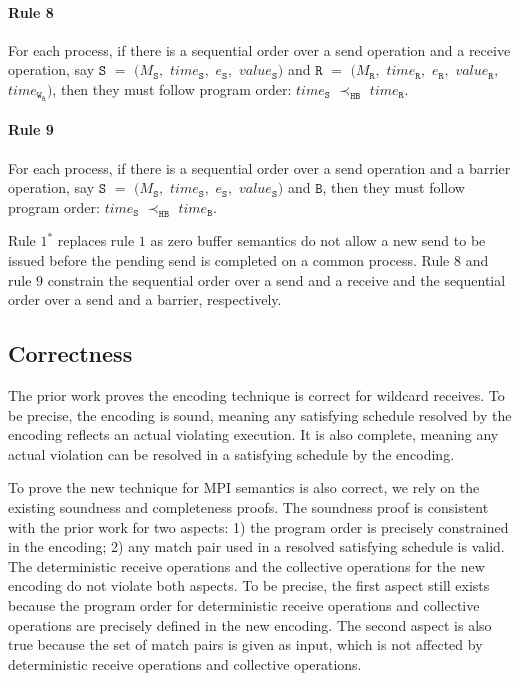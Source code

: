 \paragraph*{Rule 8} For each process, if there is a sequential order over a send operation and a receive operation, say $\mathtt{S}$ $=$ $(M_\mathtt{S},$ $\mathit{time}_\mathtt{S},$ $e_\mathtt{S},$ $\mathit{value}_\mathtt{S})$ and $\mathtt{R}$ $=$ $(M_\mathtt{R},$ $\mathit{time}_\mathtt{R},$ $e_\mathtt{R},$ $\mathit{value}_\mathtt{R},$ $\mathit{time}_{\mathtt{W}_\mathtt{R}})$, then they must follow program order: 
$\mathit{time}_\mathtt{S}$
$\prec_\mathtt{HB}$ $\mathit{time}_\mathtt{R}$.

\paragraph*{Rule 9} For each process, if there is a sequential order over a send operation and a barrier operation, say $\mathtt{S}$ $=$ $(M_\mathtt{S},$ $\mathit{time}_\mathtt{S},$ $e_\mathtt{S},$ $\mathit{value}_\mathtt{S})$ and $\mathtt{B}$, then they must follow program order: 
$\mathit{time}_\mathtt{S}$
$\prec_\mathtt{HB}$ $\mathit{time}_\mathtt{B}$.

Rule $1^*$ replaces rule $1$ as zero buffer semantics do not allow a new send to be issued before the pending send is completed on a common process. Rule $8$ and rule $9$ constrain the sequential order over a send and a receive and the sequential order over a send and a barrier, respectively.

\subsection{Correctness}
The prior work \cite{DBLP:conf/kbse/HuangMM13} proves the encoding technique is correct for wildcard receives. To be precise, the encoding is sound, meaning any satisfying schedule resolved by the encoding reflects an actual violating execution. It is also complete, meaning any actual violation can be resolved in a satisfying schedule by the encoding. 

To prove the new technique for MPI semantics is also correct, we rely on the existing soundness and completeness proofs. The soundness proof is consistent with the prior work for two aspects: 1) the program order is precisely constrained in the encoding; 2) any match pair used in a resolved satisfying schedule is valid. The deterministic receive operations and the collective operations for the new encoding do not violate both aspects. To be precise, the first aspect still exists because the program order for deterministic receive operations and collective operations are precisely defined in the new encoding. The second aspect is also true because the set of match pairs is given as input, which is not affected by deterministic receive operations and collective operations. 

